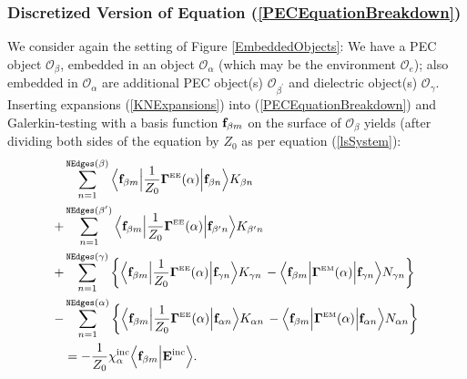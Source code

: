 \documentclass[letterpaper]{article}
\begin{document}
\subsubsection*{Discretized Version of Equation 
                (\ref{PECEquationBreakdown})}

We consider again the setting of Figure \ref{EmbeddedObjects}:
We have a PEC object $\mathcal{O}_\beta$, embedded in an object
$\mathcal{O}_\alpha$ (which may be the environment 
$\mathcal{O}_e$); also embedded in $\mathcal{O}_\alpha$ are
additional PEC object(s) $\mathcal{O}_{\beta^\prime}$ and dielectric 
object(s) $\mathcal{O}_\gamma.$ 
Inserting expansions (\ref{KNExpansions}) 
into (\ref{PECEquationBreakdown})
and Galerkin-testing with a basis function $\mathbf{f}_{\beta m}$ on 
the surface of $\mathcal{O}_\beta$ yields 
(after dividing both 
sides of the equation by $Z_0$ as per equation (\ref{lsSystem}):
\begin{align}
&\sum_{n=1}^{\texttt{NEdges}(\beta)} 
   \Big\langle 
         \mathbf{f}_{\beta m} 
   \Big| \frac{1}{Z_0} \boldsymbol{\Gamma}^{\hbox{\tiny{EE}}}(\alpha) \Big|
         \mathbf{f}_{\beta n}
   \Big\rangle 
         K_{\beta n}
\nonumber \\
+&\sum_{n=1}^{\texttt{NEdges}(\beta^\prime)} 
   \Big\langle 
         \mathbf{f}_{\beta m} 
   \Big| \frac{1}{Z_0} \boldsymbol{\Gamma}^{\hbox{\tiny{EE}}}(\alpha) \Big| 
         \mathbf{f}_{\beta^\prime n}
   \Big\rangle 
         K_{\beta^\prime n}
\nonumber \\
+&\sum_{n=1}^{\texttt{NEdges}(\gamma)} \bigg\{
   \Big\langle 
         \mathbf{f}_{\beta m} 
   \Big| \frac{1}{Z_0} \boldsymbol{\Gamma}^{\hbox{\tiny{EE}}}(\alpha) \Big| 
         \mathbf{f}_{\gamma n}
   \Big\rangle 
         K_{\gamma n}
   \,-
   \Big\langle 
         \mathbf{f}_{\beta m} 
   \Big| \boldsymbol{\Gamma}^{\hbox{\tiny{EM}}}(\alpha) \Big| 
         \mathbf{f}_{\gamma n}
   \Big\rangle 
         N_{\gamma n}
  \bigg\}
\nonumber \\
-&\sum_{n=1}^{\texttt{NEdges}(\alpha)} \bigg\{
   \Big\langle 
         \mathbf{f}_{\beta m} 
   \Big| \frac{1}{Z_0} \boldsymbol{\Gamma}^{\hbox{\tiny{EE}}}(\alpha) \Big| 
         \mathbf{f}_{\alpha n}
   \Big\rangle 
         K_{\alpha n}
   \,-
   \Big\langle 
         \mathbf{f}_{\beta m} 
   \Big| \boldsymbol{\Gamma}^{\hbox{\tiny{EM}}}(\alpha) \Big| 
         \mathbf{f}_{\alpha n}
   \Big\rangle 
         N_{\alpha n}
  \bigg\}
\nonumber \\
&=-\frac{1}{Z_0} \chi_\alpha^{\hbox{\scriptsize{inc}}} 
   \Big\langle \mathbf{f}_{\beta m} \Big| \mathbf{E}^{\hbox{\scriptsize{inc}}} \Big\rangle.
 \label{DiscretizedPECEquation}
\end{align}
\end{document}
